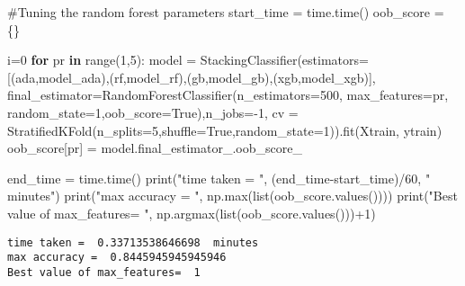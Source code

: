 \documentclass[
  letterpaper,
  DIV=11,
  numbers=noendperiod]{scrreprt}
\newenvironment{Shaded}{\begin{snugshade}}{\end{snugshade}}
\newcommand{\BuiltInTok}[1]{\textcolor[rgb]{0.00,0.23,0.31}{#1}}
\newcommand{\CommentTok}[1]{\textcolor[rgb]{0.37,0.37,0.37}{#1}}
\newcommand{\ControlFlowTok}[1]{\textcolor[rgb]{0.00,0.23,0.31}{\textbf{#1}}}
\newcommand{\DecValTok}[1]{\textcolor[rgb]{0.68,0.00,0.00}{#1}}
\newcommand{\KeywordTok}[1]{\textcolor[rgb]{0.00,0.23,0.31}{\textbf{#1}}}
\newcommand{\NormalTok}[1]{\textcolor[rgb]{0.00,0.23,0.31}{#1}}
\newcommand{\OperatorTok}[1]{\textcolor[rgb]{0.37,0.37,0.37}{#1}}
\newcommand{\StringTok}[1]{\textcolor[rgb]{0.13,0.47,0.30}{#1}}
\newcommand{\VariableTok}[1]{\textcolor[rgb]{0.07,0.07,0.07}{#1}}
\begin{document}
\begin{Shaded}
\begin{Highlighting}[]
\CommentTok{\#Tuning the random forest parameters}
\NormalTok{start\_time }\OperatorTok{=}\NormalTok{ time.time()}
\NormalTok{oob\_score }\OperatorTok{=}\NormalTok{ \{\}}

\NormalTok{i}\OperatorTok{=}\DecValTok{0}
\ControlFlowTok{for}\NormalTok{ pr }\KeywordTok{in} \BuiltInTok{range}\NormalTok{(}\DecValTok{1}\NormalTok{,}\DecValTok{5}\NormalTok{):}
\NormalTok{    model }\OperatorTok{=}\NormalTok{ StackingClassifier(estimators}\OperatorTok{=}\NormalTok{[(}\StringTok{\textquotesingle{}ada\textquotesingle{}}\NormalTok{,model\_ada),(}\StringTok{\textquotesingle{}rf\textquotesingle{}}\NormalTok{,model\_rf),(}\StringTok{\textquotesingle{}gb\textquotesingle{}}\NormalTok{,model\_gb),(}\StringTok{\textquotesingle{}xgb\textquotesingle{}}\NormalTok{,model\_xgb)],}
\NormalTok{                                   final\_estimator}\OperatorTok{=}\NormalTok{RandomForestClassifier(n\_estimators}\OperatorTok{=}\DecValTok{500}\NormalTok{, max\_features}\OperatorTok{=}\NormalTok{pr,}
\NormalTok{                                    random\_state}\OperatorTok{=}\DecValTok{1}\NormalTok{,oob\_score}\OperatorTok{=}\VariableTok{True}\NormalTok{),n\_jobs}\OperatorTok{={-}}\DecValTok{1}\NormalTok{,}
\NormalTok{                                   cv }\OperatorTok{=}\NormalTok{ StratifiedKFold(n\_splits}\OperatorTok{=}\DecValTok{5}\NormalTok{,shuffle}\OperatorTok{=}\VariableTok{True}\NormalTok{,random\_state}\OperatorTok{=}\DecValTok{1}\NormalTok{)).fit(Xtrain, ytrain)}
\NormalTok{    oob\_score[pr] }\OperatorTok{=}\NormalTok{ model.final\_estimator\_.oob\_score\_}
    
\NormalTok{end\_time }\OperatorTok{=}\NormalTok{ time.time()}
\BuiltInTok{print}\NormalTok{(}\StringTok{"time taken = "}\NormalTok{, (end\_time}\OperatorTok{{-}}\NormalTok{start\_time)}\OperatorTok{/}\DecValTok{60}\NormalTok{, }\StringTok{" minutes"}\NormalTok{)}
\BuiltInTok{print}\NormalTok{(}\StringTok{"max accuracy = "}\NormalTok{, np.}\BuiltInTok{max}\NormalTok{(}\BuiltInTok{list}\NormalTok{(oob\_score.values())))}
\BuiltInTok{print}\NormalTok{(}\StringTok{"Best value of max\_features= "}\NormalTok{, np.argmax(}\BuiltInTok{list}\NormalTok{(oob\_score.values()))}\OperatorTok{+}\DecValTok{1}\NormalTok{)}
\end{Highlighting}
\end{Shaded}

\begin{verbatim}
time taken =  0.33713538646698  minutes
max accuracy =  0.8445945945945946
Best value of max_features=  1
\end{verbatim}
\end{document}
